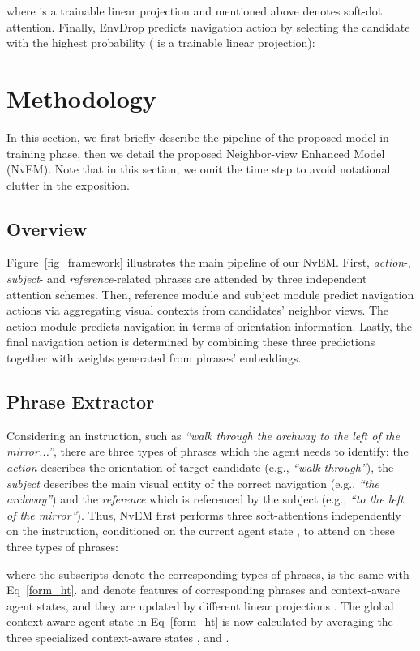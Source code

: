 \documentclass[sigconf]{acmart}
\begin{document}
where  is a trainable linear projection and  mentioned above denotes soft-dot attention.
Finally, EnvDrop predicts navigation action by selecting the candidate with the highest probability ( is a trainable linear projection):


\section{Methodology}
In this section, we first briefly describe the pipeline of the proposed model in training phase, then we detail the proposed Neighbor-view Enhanced Model (NvEM). 
Note that in this section, we omit the time step  to avoid notational clutter in the exposition.

\subsection{Overview}
Figure~\ref{fig_framework} illustrates the main pipeline of our NvEM. First, \textit{action}-, \textit{subject}- and \textit{reference}-related phrases are attended by three independent attention schemes. 
Then, reference module and subject module predict navigation actions via aggregating visual contexts from candidates' neighbor views. The action module predicts navigation in terms of orientation information.
Lastly, the final navigation action is determined by combining these three predictions together with weights generated from phrases' embeddings.


\subsection{Phrase Extractor}\label{sec_extractor}
Considering an instruction, such as \textit{``walk through the archway to the left of the mirror...''}, there are three types of phrases which the agent needs to identify: the \textit{action} describes the orientation of target candidate (e.g., \textit{``walk through''}), the \textit{subject} describes the main visual entity of the correct navigation (e.g., \textit{``the archway''}) and the \textit{reference} which is referenced by the subject (e.g., \textit{``to the left of the mirror''}). 
Thus, NvEM first performs three soft-attentions independently on the instruction, conditioned on the current agent state , to attend on these three types of phrases:

where the subscripts denote the corresponding types of phrases,  is the same with Eq~\eqref{form_ht}.  and  denote features of corresponding phrases and context-aware agent states, and they are updated by different linear projections . The global context-aware agent state  in Eq~\eqref{form_ht} is now calculated by averaging the three specialized context-aware states ,  and .
\end{document}
